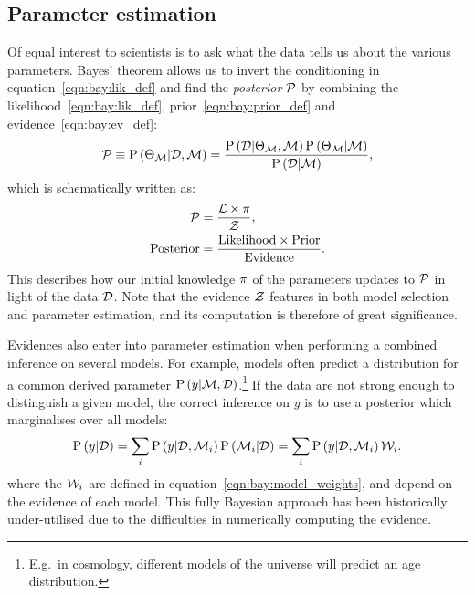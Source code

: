 \subsection{Parameter estimation}
Of equal interest to scientists is to ask what the data tells us about the various parameters.  
Bayes' theorem allows us to invert the conditioning in equation~\eqref{eqn:bay:lik_def} and find the {\em posterior\/} \(\mathcal{P}\) by combining the likelihood~\eqref{eqn:bay:lik_def}, prior~\eqref{eqn:bay:prior_def} and evidence~\eqref{eqn:bay:ev_def}:
%
\begin{equation}
  \mathcal{P}\equiv
  \mathrm{P}\left(\Theta_{\mathcal{M}}\middle|\mathcal{D},\mathcal{M}\right) = \frac{\mathrm{P}\left(\mathcal{D}\middle|\Theta_{\mathcal{M}},\mathcal{M}\right) \mathrm{P}\left(\Theta_{\mathcal{M}}\middle|\mathcal{M}\right)}{\mathrm{P}\left(\mathcal{D}\middle|\mathcal{M}\right)},
  \label{eqn:bay:bayes_theorem}
\end{equation}
%
which is schematically written as:
\begin{align}
  \mathcal{P} &= \frac{\mathcal{L} \times \pi }{\mathcal{Z} },
  \label{eqn:bay:bayes_theorem_abbrv}\\
  \mathrm{Posterior} &= \frac{\mathrm{Likelihood} \times \mathrm{Prior} }{\mathrm{Evidence} }.
\end{align}
This describes how our initial knowledge \(\pi\) of the parameters updates to \(\mathcal{P}\) in light of the data \(\mathcal{D}\). Note that the evidence \(\mathcal{Z}\) features in both model selection and parameter estimation, and its computation is therefore of great significance.

Evidences also enter into parameter estimation when performing a combined inference on several models.
For example, models often predict a distribution for a common derived parameter \(\mathrm{P}\left(y\middle|\mathcal{M},\mathcal{D}\right)\).\footnote{E.g.\ in cosmology, different models of the universe will predict an age distribution.} If the data are not strong enough to distinguish a given model, the correct inference on \(y\) is to use a posterior which marginalises over all models:
\begin{equation}
  \mathrm{P}\left(y\middle|\mathcal{D}\right) 
  = \sum_i\mathrm{P}\left(y\middle|\mathcal{D},\mathcal{M}_i\right)\mathrm{P}\left(\mathcal{M}_i\middle|\mathcal{D}\right)
  = \sum_i\mathrm{P}\left(y\middle|\mathcal{D},\mathcal{M}_i\right)\mathcal{W}_i.
\end{equation}
where the \(\mathcal{W}_i\) are defined in equation~\eqref{eqn:bay:model_weights}, and depend on the evidence of each model.
This fully Bayesian approach has been historically under-utilised due to the difficulties in numerically computing the evidence.





